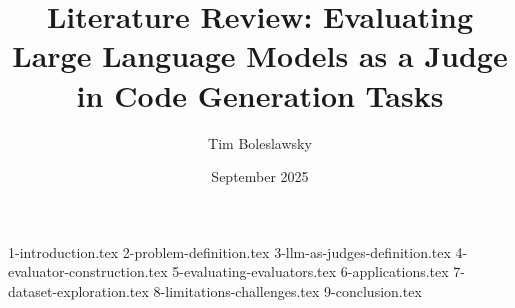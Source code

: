 \documentclass[conference]{IEEEtran}
\begin{document}
\thispagestyle{plain}
\pagestyle{plain}

\title{Literature Review: Evaluating Large Language Models as a Judge in Code Generation Tasks}
\author{Tim Boleslawsky}
\date{September 2025}

\maketitle

{1-introduction.tex}
{2-problem-definition.tex}
{3-llm-as-judges-definition.tex}
{4-evaluator-construction.tex}
{5-evaluating-evaluators.tex}
{6-applications.tex}
{7-dataset-exploration.tex}
{8-limitations-challenges.tex}
{9-conclusion.tex}



\vspace{12pt}
\end{document}

